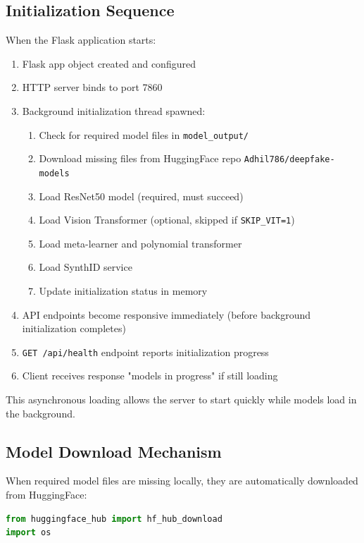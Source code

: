 \documentclass[12pt,a4paper]{book}
\begin{document}
\begin{itemize}
\subsection{Initialization Sequence}

When the Flask application starts:

\begin{enumerate}
    \item Flask app object created and configured
    \item HTTP server binds to port 7860
    \item Background initialization thread spawned:
    \begin{enumerate}
        \item Check for required model files in \texttt{model\_output/}
        \item Download missing files from HuggingFace repo \texttt{Adhil786/deepfake-models}
        \item Load ResNet50 model (required, must succeed)
        \item Load Vision Transformer (optional, skipped if \texttt{SKIP\_VIT=1})
        \item Load meta-learner and polynomial transformer
        \item Load SynthID service
        \item Update initialization status in memory
    \end{enumerate}
    \item API endpoints become responsive immediately (before background initialization completes)
    \item \texttt{GET /api/health} endpoint reports initialization progress
    \item Client receives response "models in progress" if still loading
\end{enumerate}

This asynchronous loading allows the server to start quickly while models load in the background.

\subsection{Model Download Mechanism}

When required model files are missing locally, they are automatically downloaded from HuggingFace:

\begin{lstlisting}[language=Python]
from huggingface_hub import hf_hub_download
import os


\end{lstlisting}
\end{itemize}
\end{document}
